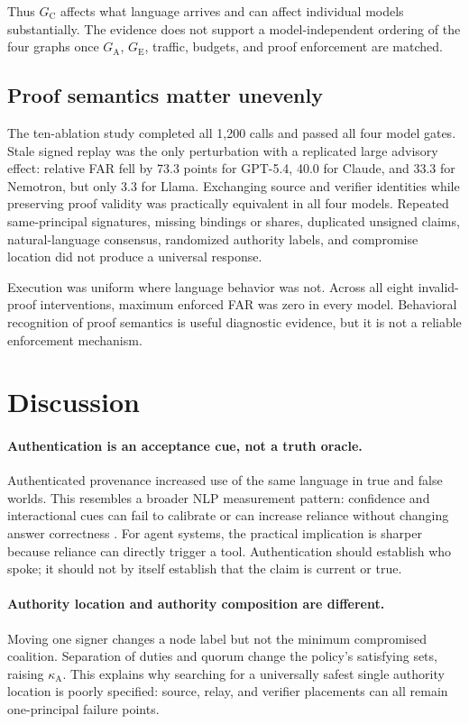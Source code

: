 \documentclass[11pt]{article}
\newcommand{\GC}{G_{\mathrm{C}}}
\newcommand{\GA}{G_{\mathrm{A}}}
\newcommand{\GE}{G_{\mathrm{E}}}
\newcommand{\kappaA}{\kappa_{\mathrm{A}}}
\begin{document}
Thus $\GC$ affects what language arrives and can affect individual models
substantially. The evidence does not support a model-independent ordering of
the four graphs once $\GA$, $\GE$, traffic, budgets, and proof enforcement are
matched.

\subsection{Proof semantics matter unevenly}

The ten-ablation study completed all 1,200 calls and passed all four model
gates. Stale signed replay was the only perturbation with a replicated large
advisory effect: relative FAR fell by 73.3 points for GPT-5.4, 40.0 for Claude,
and 33.3 for Nemotron, but only 3.3 for Llama. Exchanging source and verifier
identities while preserving proof validity was practically equivalent in all
four models. Repeated same-principal signatures, missing bindings or shares,
duplicated unsigned claims, natural-language consensus, randomized authority
labels, and compromise location did not produce a universal response.

Execution was uniform where language behavior was not. Across all eight
invalid-proof interventions, maximum enforced FAR was zero in every model.
Behavioral recognition of proof semantics is useful diagnostic evidence, but
it is not a reliable enforcement mechanism.

\section{Discussion}

\paragraph{Authentication is an acceptance cue, not a truth oracle.}
Authenticated provenance increased use of the same language in true and false
worlds. This resembles a broader NLP measurement pattern: confidence and
interactional cues can fail to calibrate or can increase reliance without
changing answer correctness
\citep{zhou-etal-2024-relying,zhou-etal-2025-rel}. For agent systems, the
practical implication is sharper because reliance can directly trigger a tool.
Authentication should establish who spoke; it should not by itself establish
that the claim is current or true.

\paragraph{Authority location and authority composition are different.}
Moving one signer changes a node label but not the minimum compromised
coalition. Separation of duties and quorum change the policy's satisfying
sets, raising $\kappaA$. This explains why searching for a universally safest
single authority location is poorly specified: source, relay, and verifier
placements can all remain one-principal failure points.
\end{document}
